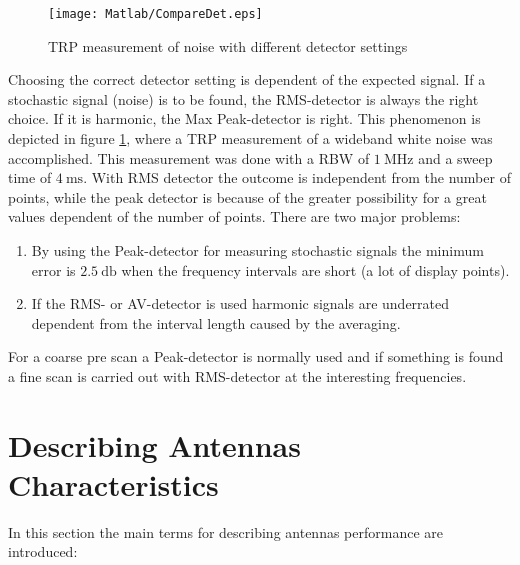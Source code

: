 \begin{figure}
\centering
\texttt{[image: Matlab/CompareDet.eps]}
\caption{TRP measurement of noise with different detector settings}
\label{fig:trpmeasnoise}
\end{figure}

Choosing the correct detector setting is dependent of the expected signal. If a stochastic signal (noise) is to be found, the \ac{RMS}-detector is always the right choice. If it is harmonic, the Max Peak-detector is right. This phenomenon is depicted in figure \ref{fig:trpmeasnoise}, where a \ac{TRP} measurement of a wideband white noise was accomplished. This measurement was done with a \ac{RBW} of $\SI{1}{\mega\hertz}$ and a sweep time of $\SI{4}{\milli\second}$. With \ac{RMS} detector the outcome is independent from the number of points, while the peak detector is because of the greater possibility for a great values dependent of the number of points. There are two major problems:

\begin{enumerate}
\item By using the Peak-detector for measuring stochastic signals the minimum error is $\SI{2.5}{\decibel}$ when the frequency intervals are short (a lot of display points).
\item If the \ac{RMS}- or AV-detector is used harmonic signals are underrated dependent from the interval length caused by the averaging.
\end{enumerate} 

For a coarse pre scan a Peak-detector is normally used and if something is found a fine scan is carried out with \ac{RMS}-detector at the interesting frequencies.

\section{Describing Antennas Characteristics}

In this section the main terms for describing antennas performance are introduced: \cite{balanis}

